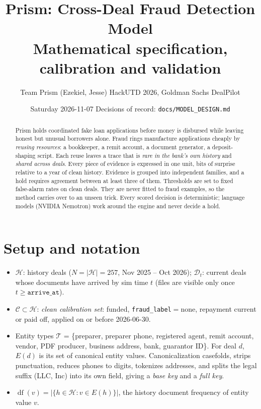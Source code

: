 \documentclass[11pt]{article}
\title{\color{navy}\textbf{Prism: Cross-Deal Fraud Detection Model}\\[2pt]\large Mathematical specification, calibration and validation}
\author{Team Prism (Ezekiel, Jesse) \quad HackUTD 2026, Goldman Sachs DealPilot}
\date{Saturday 2026-11-07 \quad Decisions of record: \texttt{docs/MODEL\_DESIGN.md}}
\newcommand{\df}{\operatorname{df}}
\begin{document}
\maketitle

\begin{abstract}
Prism holds coordinated fake loan applications before money is disbursed while leaving honest but unusual borrowers alone.
Fraud rings manufacture applications cheaply by \emph{reusing resources}: a bookkeeper, a remit account, a document generator, a deposit-shaping script.
Each reuse leaves a trace that is \emph{rare in the bank's own history} and \emph{shared across deals}.
Every piece of evidence is expressed in one unit, bits of surprise relative to a year of clean history.
Evidence is grouped into independent families, and a hold requires agreement between at least three of them.
Thresholds are set to fixed false-alarm rates on clean deals. They are never fitted to fraud examples, so the method carries over to an unseen trick.
Every scored decision is deterministic; language models (NVIDIA Nemotron) work around the engine and never decide a hold.
\end{abstract}

\section{Setup and notation}
\begin{itemize}
\item $\mathcal{H}$: history deals ($N=|\mathcal{H}|=257$, Nov 2025 -- Oct 2026); $\mathcal{D}_t$: current deals whose documents have arrived by sim time $t$ (files are visible only once $t \ge \texttt{arrive\_at}$).
\item $\mathcal{C}\subset\mathcal{H}$: \emph{clean calibration set}: funded, \texttt{fraud\_label}$=$none, repayment current or paid off, applied on or before 2026-06-30.
\item Entity types $\mathcal{T}$ = \{preparer, preparer phone, registered agent, remit account, vendor, PDF producer, business address, bank, guarantor ID\}.
For deal $d$, $E(d)$ is its set of canonical entity values. Canonicalization casefolds, strips punctuation, reduces phones to digits, tokenizes addresses, and splits the legal suffix (LLC, Inc) into its own field, giving a \emph{base key} and a \emph{full key}.
\item $\df(v)=|\{h\in\mathcal{H}: v\in E(h)\}|$, the history document frequency of entity value $v$.
\end{itemize}
\end{document}
